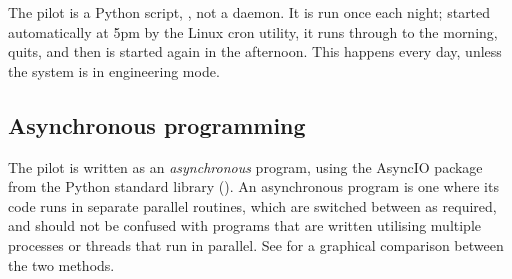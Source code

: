 \begin{colsection}

The pilot is a Python script, , not a daemon. It is run once each night; started automatically at 5pm by the Linux cron utility, it runs through to the morning, quits, and then is started again in the afternoon. This happens every day, unless the system is in engineering mode.

\end{colsection}


\subsection{Asynchronous programming}
\label{sec:async}
\begin{colsection}

The pilot is written as an \textit{asynchronous} program, using the AsyncIO package from the Python standard library (). An asynchronous program is one where its code runs in separate parallel routines, which are switched between as required, and should not be confused with programs that are written utilising multiple processes or threads that run in parallel. See  for a graphical comparison between the two methods.


\end{colsection}
